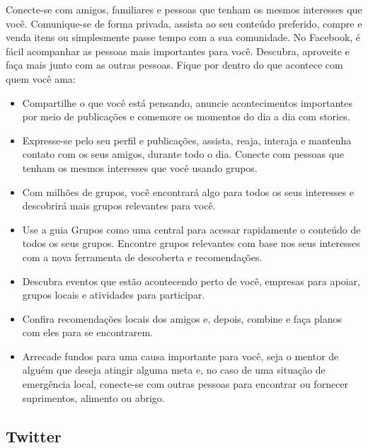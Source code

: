Conecte-se com amigos, familiares e pessoas que tenham os mesmos interesses que você. Comunique-se de forma privada, assista ao seu conteúdo preferido, compre e venda itens ou simplesmente passe tempo com a sua comunidade. No Facebook, é fácil acompanhar as pessoas mais importantes para você. Descubra, aproveite e faça mais junto com as outras pessoas.
Fique por dentro do que acontece com quem você ama:
\begin{itemize}
\item Compartilhe o que você está pensando, anuncie acontecimentos importantes por meio de publicações e comemore os momentos do dia a dia com stories.
\item Expresse-se pelo seu perfil e publicações, assista, reaja, interaja e mantenha contato com os seus amigos, durante todo o dia. 
Conecte com pessoas que tenham os mesmos interesses que você usando grupos.
\item Com milhões de grupos, você encontrará algo para todos os seus interesses e descobrirá mais grupos relevantes para você.
\item Use a guia Grupos como uma central para acessar rapidamente o conteúdo de todos os seus grupos. Encontre grupos relevantes com base nos seus interesses com a nova ferramenta de descoberta e recomendações.
\item Descubra eventos que estão acontecendo perto de você, empresas para apoiar, grupos locais e atividades para participar.
\item Confira recomendações locais dos amigos e, depois, combine e faça planos com eles para se encontrarem.
\item Arrecade fundos para uma causa importante para você, seja o mentor de alguém que deseja atingir alguma meta e, no caso de uma situação de emergência local, conecte-se com outras pessoas para encontrar ou fornecer suprimentos, alimento ou abrigo.
\end{itemize}


\subsection{Twitter}

